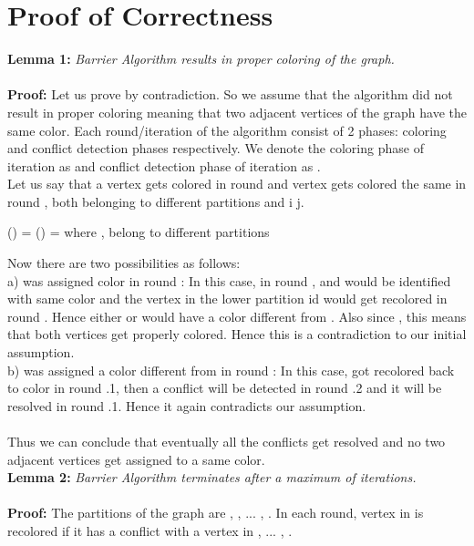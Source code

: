\documentclass[a4paper,11pt]{article}
\begin{document}
\section{Proof of Correctness}
\textbf{Lemma 1:} \textit{Barrier Algorithm results in proper coloring of the graph.}\\\\
\textbf{Proof:} Let us prove by contradiction. So we assume that the algorithm did not result in proper coloring meaning that two adjacent vertices of the graph have the same color. Each round/iteration of the algorithm consist of 2 phases: coloring and conflict detection phases respectively. We denote the coloring phase of  iteration as  and conflict detection phase of  iteration as .\\
\newline
Let us say that a vertex  gets colored  in round  and vertex  gets colored the same in round , both belonging to different partitions and i  j.\\
\begin{center}
() = () =  where ,  belong to different partitions
\end{center}
Now there are two possibilities as follows:\\
\newline
a)  was assigned color  in round : In this case, in round ,  and  would be identified with same color and the vertex in the lower partition id would get recolored in round . Hence either  or  would have a color different from . Also since   , this means that both vertices get properly colored. Hence this is a contradiction to our initial assumption.\\
\newline
b)  was assigned a color different from  in round : In this case,  got recolored back to color  in round .1, then a conflict will be detected in round .2 and it will be resolved in round .1. Hence it again contradicts our assumption.\\
\\Thus we can conclude that eventually all the conflicts get resolved and no two adjacent vertices get assigned to a same color.\\
\newline
\textbf{Lemma 2:} \textit{Barrier Algorithm terminates after a maximum of  iterations.}\\\\
\textbf{Proof:} The partitions of the graph are , , ... , . In each round, vertex in  is recolored if it has a conflict with a vertex in , ... , .\\
\end{document}
